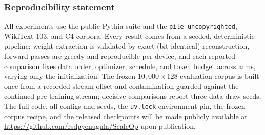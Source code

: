 \documentclass{article}
\begin{document}










\subsubsection*{Reproducibility statement}
All experiments use the public Pythia suite and the
\texttt{pile-uncopyrighted}, WikiText-103, and C4 corpora. Every result comes
from a seeded, deterministic pipeline: weight extraction is validated by exact
(bit-identical) reconstruction, forward passes are greedy and reproducible per
device, and each reported comparison fixes data order, optimizer, schedule, and
token budget across arms, varying only the initialization. The frozen
$10{,}000\times128$ evaluation corpus is built once from a recorded stream offset
and contamination-guarded against the continued-pre-training stream; decisive
comparisons report three data-draw seeds. The full code, all configs and seeds,
the \texttt{uv.lock} environment pin, the frozen-corpus recipe, and the released
checkpoints will be made publicly available at
\url{https://github.com/rsdpyenugula/ScaleOp} upon publication.




\appendix

\end{document}
